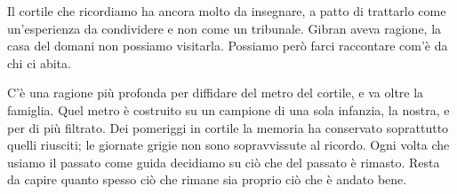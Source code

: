 Il cortile che ricordiamo ha ancora molto da insegnare, a patto di trattarlo come un'esperienza da condividere e non come un tribunale. Gibran aveva ragione, la casa del domani non possiamo visitarla. Possiamo però farci raccontare com'è da chi ci abita.

C'è una ragione più profonda per diffidare del metro del cortile, e va oltre la famiglia. Quel metro è costruito su un campione di una sola infanzia, la nostra, e per di più filtrato. Dei pomeriggi in cortile la memoria ha conservato soprattutto quelli riusciti; le giornate grigie non sono sopravvissute al ricordo. Ogni volta che usiamo il passato come guida decidiamo su ciò che del passato è rimasto. Resta da capire quanto spesso ciò che rimane sia proprio ciò che è andato bene.

